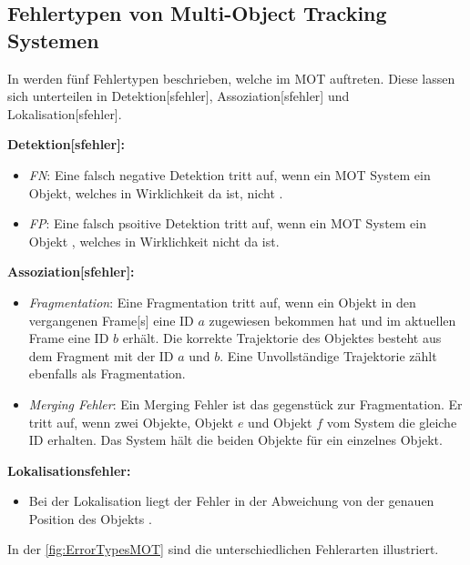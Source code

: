 \subsection{Fehlertypen von Multi-Object Tracking Systemen} \label{sec:MOT Fehlertypen}
In \cite{Leichter.2013} werden fünf Fehlertypen beschrieben, welche im \gls{MOT} auftreten. Diese lassen sich unterteilen in \gls{Detektion}[sfehler], \gls{Assoziation}[sfehler] und \gls{Lokalisation}[sfehler]. \par

\textbf{\gls{Detektion}[sfehler]:}
\begin{itemize}
    \item \textit{\gls{FN}}: Eine falsch negative \gls{Detektion} tritt auf, wenn ein \gls{MOT} System ein Objekt, welches in Wirklichkeit da ist, nicht .
    \item \textit{\gls{FP}}: Eine falsch psoitive \gls{Detektion} tritt auf, wenn ein \gls{MOT} System ein Objekt , welches in Wirklichkeit nicht da ist.
\end{itemize}

\textbf{\gls{Assoziation}[sfehler]:}
\begin{itemize}
    \item \textit{\gls{Fragmentation}}: Eine Fragmentation tritt auf, wenn ein Objekt in den vergangenen \gls{Frame}[s] eine \acrshort{ID} \(a\) zugewiesen bekommen hat und im aktuellen \gls{Frame} eine \acrshort{ID} \(b\) erhält. Die korrekte \gls{Trajektorie} des Objektes besteht aus dem Fragment mit der \acrshort{ID} \(a\) und \(b\). Eine Unvollständige \gls{Trajektorie} zählt ebenfalls als Fragmentation. 
    \item \textit{\gls{Merging Fehler}}: Ein Merging Fehler ist das gegenstück zur Fragmentation. Er tritt auf, wenn zwei Objekte, Objekt \(e\) und Objekt \(f\) vom System die gleiche \acrshort{ID} erhalten. Das System hält die beiden Objekte für ein einzelnes Objekt. 
\end{itemize}

\textbf{\gls{Lokalisationsfehler}:}
\begin{itemize}
    \item Bei der \gls{Lokalisation} liegt der Fehler in der Abweichung von der genauen Position des Objekts \cite{Leichter.2013}. \par
\end{itemize}

In der \autoref{fig:ErrorTypesMOT} sind die unterschiedlichen Fehlerarten illustriert. 


